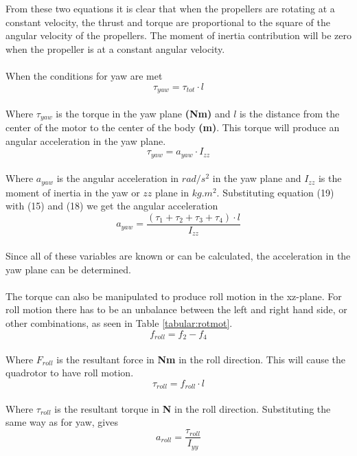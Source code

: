 From these two equations it is clear that when the propellers are rotating at a constant velocity, the thrust and torque are proportional to the square of the angular velocity of the propellers. The moment of inertia contribution will be zero when the propeller is at a constant angular velocity. 
\\\\
When the conditions for yaw are met
\begin{equation}
\tau_{yaw} = \tau_{tot}\cdot l
\end{equation}
\\
Where $\tau_{yaw}$ is the torque in the yaw plane \textbf{(Nm) }and $l$ is the distance from the center of the motor to the center of the body \textbf{(m)}. This torque will produce an angular acceleration in the yaw plane. 
\begin{equation}
\tau_{yaw} = a_{yaw}\cdot I_{zz}
\end{equation}
\\
Where $a_{yaw}$ is the angular acceleration in $rad/s^2$ in the yaw plane and $I_{zz}$ is the moment of inertia in the yaw or $zz$ plane in $kg.m^2$. Substituting equation (19) with (15) and (18) we get the angular acceleration
\begin{equation}
a_{yaw} = \frac{(\tau_1 + \tau_2 + \tau_3 + \tau_4) \cdot l}{I_{zz}}
\end{equation}
\\ 
Since all of these variables are known or can be calculated, the acceleration in the yaw plane can be determined. 
\\\\
The torque can also be manipulated to produce roll motion in the xz-plane. For roll motion there has to be an unbalance between the left and right hand side, or other combinations, as seen in Table \ref{tabular:rotmot}. 
\begin{equation}
f_{roll} = f_2 - f_4
\end{equation}
\\
Where $F_{roll}$ is the resultant force in \textbf{Nm} in the roll direction. This will cause the quadrotor to have roll motion. 
\begin{equation}
\tau_{roll} = f_{roll}\cdot l
\end{equation}
\\
Where $\tau_{roll}$ is the resultant torque in \textbf{N} in the roll direction. Substituting the same way as for yaw, gives
\begin{equation}
a_{roll} = \frac{\tau_{roll}}{I_{yy}}
\end{equation}
